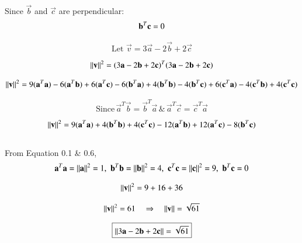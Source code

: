 \documentclass[journal]{IEEEtran}
\begin{document}
Since $\vec{b}$ and $\vec{c}$ are perpendicular: 
\begin{equation}
\vec{b}^T\vec{c} = 0\\
\end{equation}


\begin{equation}
\text{Let} \, \,\vec{v} = 3\vec{a} - 2\vec{b} + 2\vec{c}
\end{equation}


\begin{equation}
\norm{\vec{v}}^2 = (3\vec{a} - 2\vec{b} + 2\vec{c})^T(3\vec{a} - 2\vec{b} + 2\vec{c})
\end{equation}

\begin{equation}
\norm{\vec{v}}^2 = 9(\vec{a}^T\vec{a}) -6(\vec{a}^T\vec{b}) +6(\vec{a}^T\vec{c}) - 6(\vec{b}^T\vec{a}) + 4(\vec{b}^T\vec{b}) -4(\vec{b}^T\vec{c})+ 6(\vec{c}^T\vec{a}) - 4(\vec{c}^T\vec{b}) + 4(\vec{c}^T\vec{c})\\
\end{equation}


\begin{equation}
    \text{Since} \,  \vec{a}^T\vec{b} = \vec{b}^T\vec{a} \, \text{\&}
\, \vec{a}^T\vec{c} = \vec{c}^T\vec{a}
\end{equation}


\begin{equation}
\norm{\vec{v}}^2  =9(\vec{a}^T\vec{a}) + 4(\vec{b}^T\vec{b}) + 4(\vec{c}^T\vec{c}) - 12(\vec{a}^T\vec{b}) + 12(\vec{a}^T\vec{c}) - 8(\vec{b}^T\vec{c})
\end{equation}\\

From Equation 0.1 \& 0.6,
\begin{equation}
\vec{a}^T\vec{a} = \norm{\vec{a}}^2 = 1, \,\,
\vec{b}^T\vec{b} = \norm{\vec{b}}^2 = 4, \,\,
\vec{c}^T\vec{c} = \norm{\vec{c}}^2 = 9, \,\,
\vec{b}^T\vec{c} = 0
\end{equation}


\begin{equation}
\norm{\vec{v}}^2 = 9 + 16 + 36
\end{equation}


\begin{align}
    \centering
    \norm{\vec{v}}^2 = 61 
    \quad \Rightarrow \quad
    \norm{\vec{v}} = \sqrt{61}
\end{align}

\begin{align}
\centering
\boxed{\norm{3\vec{a} - 2\vec{b} + 2\vec{c}} = \sqrt{61}}
\end{align}
\end{document}
